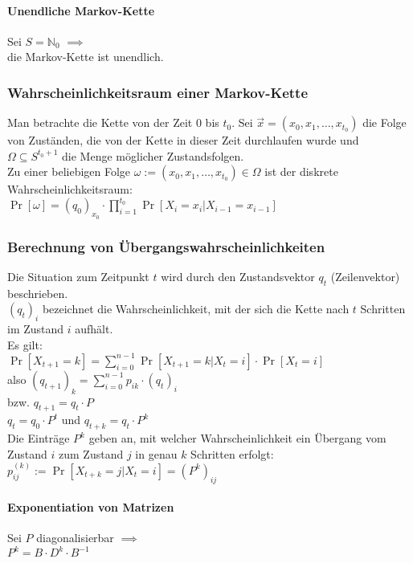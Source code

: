 \documentclass[a4paper,9pt]{extarticle}
\begin{document}
\paragraph*{Unendliche Markov-Kette}
Sei $S = \mathbb{N}_0$ $\implies$ \\
die Markov-Kette ist unendlich.

\subsubsection*{Wahrscheinlichkeitsraum einer Markov-Kette}
Man betrachte die Kette von der Zeit $0$ bis $t_0$. Sei $\vec{x} = (x_0, x_1, \dots, x_{t_0})$ die Folge von Zuständen, die von der Kette in dieser Zeit durchlaufen wurde und $\Omega \subseteq S^{t_0 + 1}$ die Menge möglicher Zustandsfolgen. \\
Zu einer beliebigen Folge $\omega := (x_0, x_1, \dots, x_{t_0}) \in \Omega$ ist der diskrete Wahrscheinlichkeitsraum: \\
$\Pr[\omega] = (q_0)_{x_0} ⋅ \prod_{i=1}^{t_0} \Pr[X_i = x_i | X_{i-1} = x_{i - 1}]$

\subsubsection*{Berechnung von Übergangswahrscheinlichkeiten}
Die Situation zum Zeitpunkt $t$ wird durch den Zustandsvektor $q_t$ (Zeilenvektor) beschrieben. \\
$(q_t)_i$ bezeichnet die Wahrscheinlichkeit, mit der sich die Kette nach $t$ Schritten im Zustand $i$ aufhält. \\
Es gilt: \\
$\Pr[X_{t+1} = k] = \sum_{i=0}^{n-1} \Pr[X_{t+1} = k | X_t = i] ⋅ \Pr[X_t = i]$ \\
also $(q_{t + 1})_k = \sum_{i = 0}^{n - 1} p_{ik} ⋅ (q_t)_i$ \\
bzw. $q_{t + 1} = q_t ⋅ P$ \\

$q_t = q_0 ⋅ P^t$ und $q_{t + k} = q_t ⋅ P^k$ \\

Die Einträge $P^k$ geben an, mit welcher Wahrscheinlichkeit ein Übergang vom Zustand $i$ zum Zustand $j$ in genau $k$ Schritten erfolgt: \\

$p_{ij}^{(k)} := \Pr[X_{t + k} = j | X_t = i] = (P^k)_{ij}$

\paragraph*{Exponentiation von Matrizen}
Sei $P$ diagonalisierbar $\implies$ \\
$P^k = B ⋅ D^k ⋅ B^{-1}$
\end{document}
